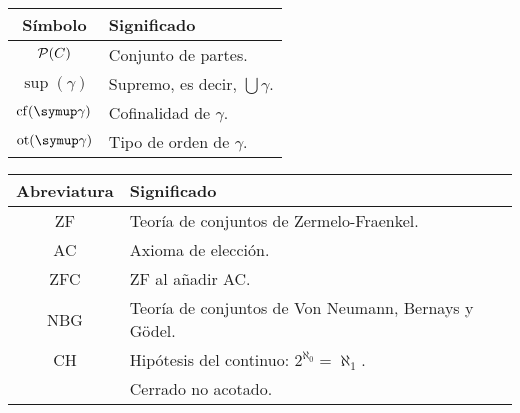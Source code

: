 \documentclass
[
  12pt,
  letterpaper,
  openany,
  oneside,
]{book}
\begin{document}
\begin{center}
    \begin{tabular}{cl}
        Símbolo & Significado \\
        \hline\noalign{\smallskip}
        $\pwset{C}$ & Conjunto de partes.\\
        $\sup(\gamma)$ & Supremo, es decir, $\bigcup \gamma$.\\
        $\cf(\gamma)$ & Cofinalidad de $\gamma$.\\
        $\ot(\gamma)$ & Tipo de orden de $\gamma$.
    \end{tabular}
\end{center}

\newpage
{}

\begin{center}
    \begin{tabular}{cl}
        Abreviatura & Significado \\
        \hline\noalign{\smallskip}
        ZF & Teoría de conjuntos de Zermelo-Fraenkel.\\
        AC & Axioma de elección.\\
        ZFC & ZF al añadir AC.\\
        NBG & Teoría de conjuntos de Von Neumann, Bernays y Gödel.\\
        CH & Hipótesis del continuo: $2^{\aleph_0} = \aleph_1$. \\
        \cna{} & Cerrado no acotado. \\
    \end{tabular}
\end{center}
\fi
\mainmatter
\pagestyle{headings}
\makeatletter
\gdef\@oddhead{\hfil\thepage}
\makeatother
\ifintro
{}
\thispagestyle{empty}
\end{document}

